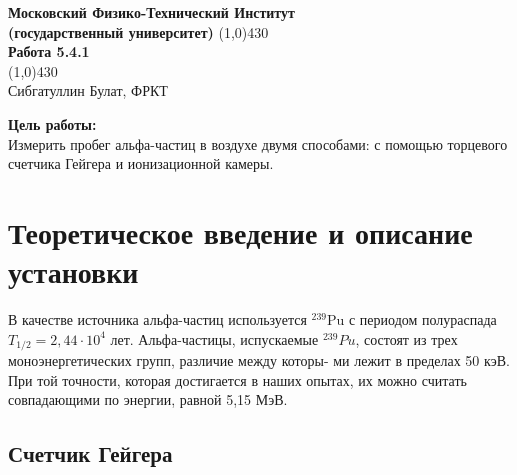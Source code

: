 \documentclass[a4paper, 12pt]{article}%
\begin{document}
\begin{titlepage}

\begin{center}
\large\textbf{Московский Физико-Технический Институт}\\
\large\textbf{(государственный университет)}
\vfill
\line(1,0){430}\\[1mm]
\huge\textbf{Работа 5.4.1}\\
\line(1,0){430}\\[1mm]
\vfill
\large Сибгатуллин Булат, ФРКТ\\
\end{center}

\end{titlepage}
\noindent \textbf{Цель работы:} \\
\indent Измерить пробег альфа-частиц в воздухе двумя способами: с помощью торцевого счетчика Гейгера и ионизационной камеры.\\

\section{Теоретическое введение и описание установки}
	
	В качестве источника альфа-частиц используется $ ^{239}  $Pu  с периодом полураспада $ T_{1/2} = 2,44 \cdot 10^4 $ лет. Альфа-частицы, испускаемые $ ^{239} Pu $, состоят из трех моноэнергетических групп, различие между которы-
	ми лежит в пределах 50 кэВ. При той точности, которая достигается
	в наших опытах, их можно считать совпадающими по энергии, равной
	5,15 МэВ.
	
	\subsection{Счетчик Гейгера}
	
\end{document}
